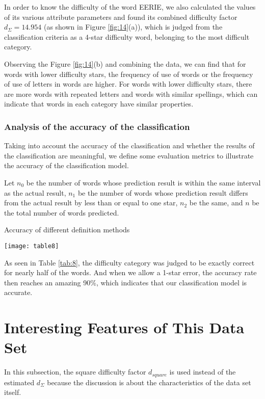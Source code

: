 \documentclass[12pt]{mcmthesis}
\begin{document}
In order to know the difficulty of the word EERIE, we also calculated the values of its various attribute parameters and found its combined difficulty factor $ d_{\varSigma}=14.954 $ (as shown in Figure \ref{fig:14}(a)), which is judged from the classification criteria as a 4-star difficulty word, belonging to the most difficult category.

Observing the Figure \ref{fig:14}(b) and combining the data, we can find that for words with lower difficulty stars, the frequency of use of words or the frequency of use of letters in words are higher. For words with lower difficulty stars, there are more words with repeated letters and words with similar spellings, which can indicate that words in each category have similar properties.
\subsubsection{Analysis of the accuracy of the classification}
\hspace{1.4em}Taking into account the accuracy of the classification and whether the results of the classification are meaningful, we define some evaluation metrics to illustrate the accuracy of the classification model.

Let $ n_{0} $ be the number of words whose prediction result is within the same interval as the actual result, $ n_{1} $ be the number of words whose prediction result differs from the actual result by less than or equal to one star, $ n_{2} $ be the same, and $ n $ be the total number of words predicted.
\begin{table}[!htbp]
	\small
	\centering
	\caption{Accuracy of different definition methods}
	\texttt{[image: table8]}
	\label{tab:8}
\end{table}
As seen in Table \ref{tab:8}, the difficulty category was judged to be exactly correct for nearly half of the words. And when we allow a 1-star error, the accuracy rate then reaches an amazing 90\%, which indicates that our classification model is accurate.
\\[0.01pt]
\section{Interesting Features of This Data Set}
\hspace{1.4em} In this subsection, the square difficulty factor $ d_{square} $ is used instead of the estimated $ d_{\varSigma} $ because the discussion is about the characteristics of the data set itself.
\end{document}
